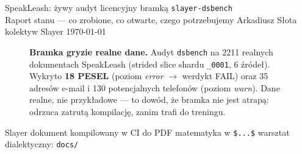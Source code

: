 \begin{titlepage}
\centering
\vspace*{1.2cm}

\slayertitle
  {SpeakLeash: żywy audyt licencyjny bramką \texttt{slayer-dsbench}\\[0.2cm]
   \large Raport stanu --- co zrobione, co otwarte, czego potrzebujemy}%
  {Arkadiusz Słota \textperiodcentered{} kolektyw Slayer}%
  {\today}%

\vspace{1.2cm}

\begin{figure}[h]
  \centering
  \caption{\textbf{Bramka gryzie realne dane.} Audyt \texttt{dsbench} na 2211 realnych
  dokumentach SpeakLeash (strided slice shardu \texttt{\_0001}, 6 źródeł). Wykryto
  \textbf{18 PESEL} (poziom \emph{error} $\to$ werdykt FAIL) oraz 35 adresów e-mail i
  130 potencjalnych telefonów (poziom \emph{warn}). Dane realne, nie przykładowe ---
  to dowód, że bramka nie jest atrapą: odrzuca zatrutą kompilację, zanim trafi do treningu.}
  \label{fig:hero}
\end{figure}

\vfill
{\small Slayer \textperiodcentered{} dokument kompilowany w CI do PDF \textperiodcentered{} matematyka w \texttt{\$...\$} \textperiodcentered{} warsztat dialektyczny: \texttt{docs/}}
\end{titlepage}
